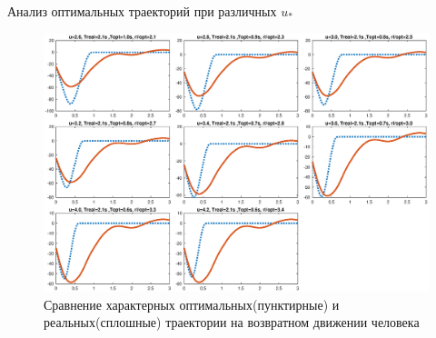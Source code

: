 \documentclass[10pt]{beamer}
\begin{document}
\begin{frame}{Анализ оптимальных траекторий при различных $u_\ast$}
	\begin{figure}[h!]
		\centering
		\includegraphics[width=0.9\linewidth]{final_graphs_1.eps}
		\caption{Сравнение характерных оптимальных(пунктирные) и реальных(сплошные) траектории на возвратном движении человека}
		\label{final_graphs_1}
	\end{figure}
\end{frame}
\end{document}
